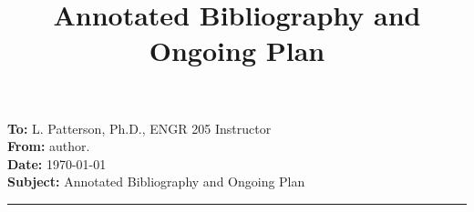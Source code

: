 \documentclass[12pt]{article}
\title{\textbf{\small Annotated Bibliography and Ongoing Plan }}
\begin{document}
\nocite{*}

\thispagestyle{plain}

\noindent \textbf{To:} L. Patterson, Ph.D., ENGR 205 Instructor  \\
\textbf{From:} author. \\
\textbf{Date:} \today \\
\textbf{Subject:} Annotated Bibliography and Ongoing Plan \\
\hrule 



   
\end{document}
